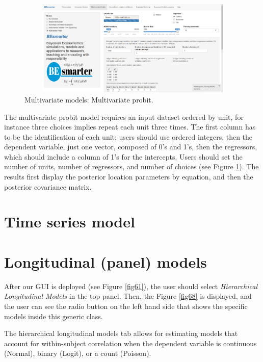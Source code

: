 \begin{figure}
	\includegraphics[width=340pt, height=130pt]{Chapters/chapterGUI/figures/Figure7.png}
	\caption[List of figure caption goes here]{Multivariate models: Multivariate probit.}\label{fig67}
\end{figure} 

The multivariate probit model requires an input dataset ordered by unit, for instance three choices implies repeat each unit three times. The first column has to be the identification of each unit; users should use ordered integers, then the dependent variable, just one vector, composed of 0's and 1's, then the regressors, which should include a column of 1's for the intercepts. Users should set the number of units, number of regressors, and number of choices (see Figure \ref{fig67}). The results first display the posterior location parameters by equation, and then the posterior covariance matrix.

\section{Time series model}\label{secGUI4}

\section{Longitudinal (panel) models}\label{secGUI5}
After our GUI is deployed (see Figure \ref{fig61}), the user should select \textit{Hierarchical Longitudinal Models} in the top panel. Then, the Figure \ref{fig68} is displayed, and the user can see the radio button on the left hand side that shows the specific models inside this generic class.


The hierarchical longitudinal models tab allows for estimating models that account for within-subject correlation when the dependent variable is continuous (Normal), binary (Logit), or a count (Poisson).

